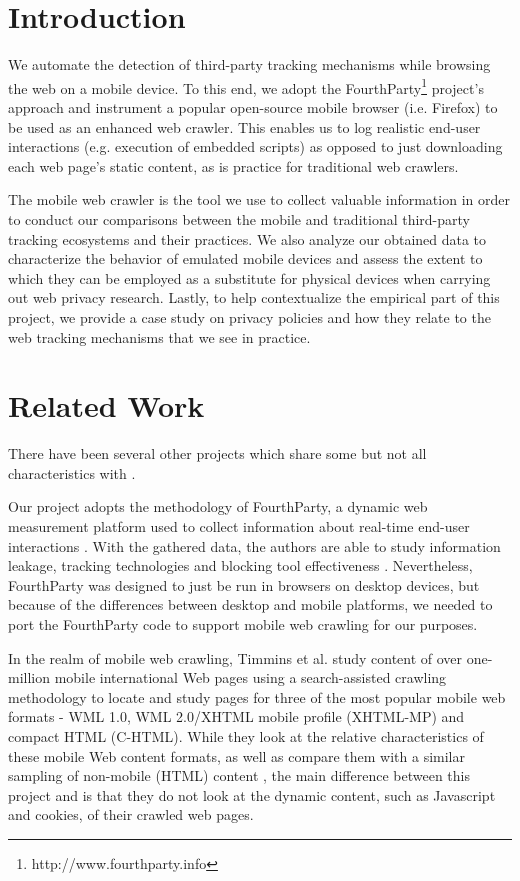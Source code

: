 \documentclass{acm_proc_article-sp}
\begin{document}
\section{Introduction}
We automate the detection of third-party tracking mechanisms while browsing the web on a mobile device. To this end, we adopt the FourthParty\footnote{http://www.fourthparty.info} project's approach and instrument a popular open-source mobile browser (i.e. Firefox) to be used as an enhanced web crawler. This enables us to log realistic end-user interactions (e.g. execution of embedded scripts) as opposed to just downloading each web page's static content, as is practice for traditional web crawlers.

The mobile web crawler is the tool we use to collect valuable information in order to conduct our comparisons between the mobile and traditional third-party tracking ecosystems and their practices. We also analyze our obtained data to characterize the behavior of emulated mobile devices and assess the extent to which they can be employed as a substitute for physical devices when carrying out web privacy research. Lastly, to help contextualize the empirical part of this project, we provide a case study on privacy policies and how they relate to the web tracking mechanisms that we see in practice.

\section{Related Work}
There have been several other projects which share some but not all characteristics with \fpm.

Our project adopts the methodology of FourthParty, a dynamic web measurement platform used to collect information about real-time end-user interactions \cite{mayer}. With the gathered data, the authors are able to study information leakage, tracking technologies and blocking tool effectiveness \cite{mayer}. Nevertheless, FourthParty was designed to just be run in browsers on desktop devices, but because of the differences between desktop and mobile platforms, we needed to port the FourthParty code to support mobile web crawling for our purposes.

In the realm of mobile web crawling, Timmins et al. \cite{timmins} study content of over one-million mobile international Web pages using a search-assisted crawling methodology to locate and study pages for three of the most popular mobile web formats - WML 1.0, WML 2.0/XHTML mobile profile (XHTML-MP) and compact HTML (C-HTML). While they look at the relative characteristics of these mobile Web content formats, as well as compare them with a similar sampling of non-mobile (HTML) content \cite{timmins}, the main difference between this project and \fpm is that they do not look at the dynamic content, such as Javascript and cookies, of their crawled web pages. 
\end{document}
